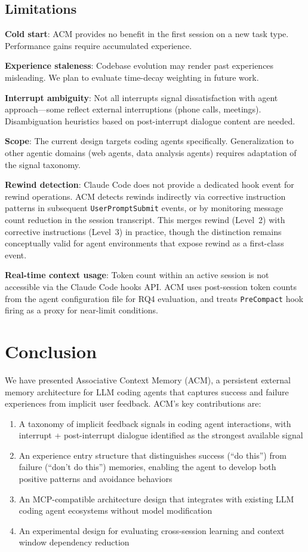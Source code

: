 \documentclass[conference]{IEEEtran}
\begin{document}
\subsection{Limitations}

\textbf{Cold start}: ACM provides no benefit in the first session on a new task type. Performance gains require accumulated experience.

\textbf{Experience staleness}: Codebase evolution may render past experiences misleading. We plan to evaluate time-decay weighting in future work.

\textbf{Interrupt ambiguity}: Not all interrupts signal dissatisfaction with agent approach---some reflect external interruptions (phone calls, meetings). Disambiguation heuristics based on post-interrupt dialogue content are needed.

\textbf{Scope}: The current design targets coding agents specifically. Generalization to other agentic domains (web agents, data analysis agents) requires adaptation of the signal taxonomy.

\textbf{Rewind detection}: Claude Code does not provide a dedicated hook event for rewind operations. ACM detects rewinds indirectly via corrective instruction patterns in subsequent \texttt{UserPromptSubmit} events, or by monitoring message count reduction in the session transcript. This merges rewind (Level~2) with corrective instructions (Level~3) in practice, though the distinction remains conceptually valid for agent environments that expose rewind as a first-class event.

\textbf{Real-time context usage}: Token count within an active session is not accessible via the Claude Code hooks API. ACM uses post-session token counts from the agent configuration file for RQ4 evaluation, and treats \texttt{PreCompact} hook firing as a proxy for near-limit conditions.

\section{Conclusion}

We have presented Associative Context Memory (ACM), a persistent external memory architecture for LLM coding agents that captures success and failure experiences from implicit user feedback. ACM's key contributions are:

\begin{enumerate}
\item A taxonomy of implicit feedback signals in coding agent interactions, with interrupt + post-interrupt dialogue identified as the strongest available signal
\item An experience entry structure that distinguishes success (``do this'') from failure (``don't do this'') memories, enabling the agent to develop both positive patterns and avoidance behaviors
\item An MCP-compatible architecture design that integrates with existing LLM coding agent ecosystems without model modification
\item An experimental design for evaluating cross-session learning and context window dependency reduction
\end{enumerate}
\end{document}
